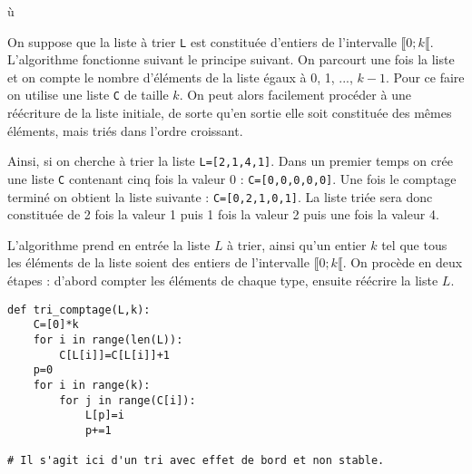 ù\setcounter{numques}{0}

On suppose que la liste à trier \texttt{L} est constituée d’entiers de l’intervalle  $\llbracket 0; k \llbracket$. L’algorithme
fonctionne suivant le principe suivant. On parcourt une fois la liste et on compte le nombre d’éléments de
la liste égaux à 0, 1, ..., $k-1$. Pour ce faire on utilise une liste \texttt{C} de taille $k$. On peut alors facilement procéder à une
réécriture de la liste initiale, de sorte qu’en sortie elle soit constituée des mêmes éléments, mais triés dans l’ordre
croissant.

Ainsi, si on cherche à trier la liste \texttt{L=[2,1,4,1]}. Dans un premier temps on crée une liste \texttt{C} contenant cinq fois la valeur 0 : \texttt{C=[0,0,0,0,0]}. Une fois le comptage terminé on obtient la liste suivante : \texttt{C=[0,2,1,0,1]}. La liste triée sera donc constituée de 2 fois la valeur 1 puis 1 fois la valeur 2 puis une fois la valeur 4.



L’algorithme prend en entrée la liste $L$ à trier, ainsi qu’un entier $k$ tel que tous les éléments de la
liste soient des entiers de l’intervalle $\llbracket 0; k \llbracket$. On procède en deux étapes : d’abord compter les éléments de chaque type,
ensuite réécrire la liste $L$.




\ifprof
\begin{lstlisting}
def tri_comptage(L,k):
    C=[0]*k
    for i in range(len(L)):
        C[L[i]]=C[L[i]]+1
    p=0
    for i in range(k):
        for j in range(C[i]):
            L[p]=i
            p+=1
            
# Il s'agit ici d'un tri avec effet de bord et non stable. 
\end{lstlisting}
\else
\fi